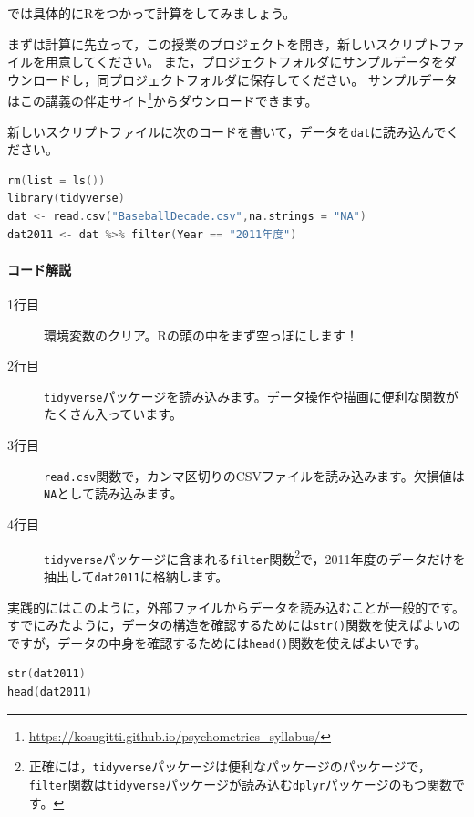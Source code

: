 \documentclass{ltjsbook}
\begin{document}
では具体的にRをつかって計算をしてみましょう。

まずは計算に先立って，この授業のプロジェクトを開き，新しいスクリプトファイルを用意してください。
また，プロジェクトフォルダにサンプルデータをダウンロードし，同プロジェクトフォルダに保存してください。
サンプルデータはこの講義の伴走サイト\footnote{\url{https://kosugitti.github.io/psychometrics_syllabus/}}からダウンロードできます。

新しいスクリプトファイルに次のコードを書いて，データを\verb|dat|に読み込んでください。
\begin{lstlisting}[language=c++,label={code:5_01},caption={データの読み込み}]
rm(list = ls())
library(tidyverse)
dat <- read.csv("BaseballDecade.csv",na.strings = "NA")
dat2011 <- dat %>% filter(Year == "2011年度")
\end{lstlisting}

\paragraph{コード解説}
\begin{description}
	\item[1行目] 環境変数のクリア。Rの頭の中をまず空っぽにします！
	\item[2行目] \verb|tidyverse|パッケージを読み込みます。データ操作や描画に便利な関数がたくさん入っています。
	\item[3行目] \verb|read.csv|関数で，カンマ区切りのCSVファイルを読み込みます。欠損値は\verb|NA|として読み込みます。
	\item[4行目] \verb|tidyverse|パッケージに含まれる\verb|filter|関数\footnote{正確には，\verb|tidyverse|パッケージは便利なパッケージのパッケージで，\verb|filter|関数は\verb|tidyverse|パッケージが読み込む\verb|dplyr|パッケージのもつ関数です。}で，2011年度のデータだけを抽出して\verb|dat2011|に格納します。
\end{description}


実践的にはこのように，外部ファイルからデータを読み込むことが一般的です。
すでにみたように，データの構造を確認するためには\verb|str()|関数を使えばよいのですが，データの中身を確認するためには\verb|head()|関数を使えばよいです。

\begin{lstlisting}[language=c++,label={code:5_02},caption={データの確認}]
str(dat2011)
head(dat2011)
\end{lstlisting}
\end{document}
